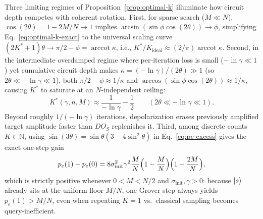 Three limiting regimes of Proposition~\ref{prop:optimal-k} illuminate how circuit depth competes with coherent rotation. First, for sparse search ($M \ll N$), $\cos(2\theta) = 1 - 2M/N \to 1$ implies $\arcsin(\sin\phi\cos(2\theta)) \to \phi$, simplifying Eq.~\eqref{eq:optimal-k-exact} to the universal scaling curve $(2K^* + 1)\theta \to \pi/2 - \phi = \operatorname{arccot}\kappa$, i.e., $K^* / K_{\mathrm{ideal}} \approx (2/\pi)\operatorname{arccot}\kappa$. Second, in the intermediate overdamped regime where per-iteration loss is small ($-\ln\gamma \ll 1$) yet cumulative circuit depth makes $\kappa = (-\ln\gamma)/(2\theta) \gg 1$ (so $2\theta \ll -\ln\gamma \ll 1$), both $\pi/2 - \phi \approx 1/\kappa$ and $\arccos(\sin\phi\cos(2\theta)) \approx 1/\kappa$, causing $K^*$ to saturate at an $N$-independent ceiling:
\begin{equation}
K^*(\gamma, n, M) \approx \frac{1}{-\ln\gamma} - \frac{1}{2} \qquad (2\theta \ll -\ln\gamma \ll 1).
\label{eq:kstar-ceiling}
\end{equation}
Beyond roughly $1/(-\ln\gamma)$ iterations, depolarization erases previously amplified target amplitude faster than $DO_S$ replenishes it. Third, among discrete counts $K \in \mathbb{N}$, using $\sin(3\theta) = \sin\theta(3 - 4\sin^2\theta)$ in Eq.~\eqref{eq:pe-excess} gives the exact one-step gain
\begin{equation}
p_e(1) - p_e(0) = 8\sigma_{\mathrm{init}}^2\gamma^2 \frac{M}{N}\Bigl(1 - \frac{M}{N}\Bigr)\Bigl(1 - \frac{2M}{N}\Bigr),
\label{eq:k1-beats-k0}
\end{equation}
which is strictly positive whenever $0 < M < N/2$ and $\sigma_{\mathrm{init}}, \gamma > 0$: because $\ket{s}$ already sits at the uniform floor $M/N$, one Grover step always yields $p_e(1) > M/N$, even when repeating $K = 1$ vs.\ classical sampling becomes query-inefficient.

